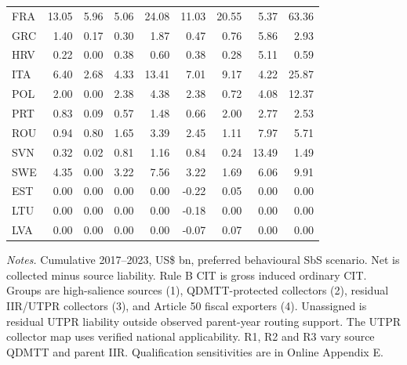 \begin{table}[htbp]
\begin{tabular}{@{}lrrrrrrrr@{}}
FRA & 13.05 &  5.96 &  5.06 & 24.08 & 11.03 & 20.55 &   5.37 &  63.36 \\
GRC &  1.40 &  0.17 &  0.30 &  1.87 &  0.47 &  0.76 &   5.86 &   2.93 \\
HRV &  0.22 &  0.00 &  0.38 &  0.60 &  0.38 &  0.28 &   5.11 &   0.59 \\
ITA &  6.40 &  2.68 &  4.33 & 13.41 &  7.01 &  9.17 &   4.22 &  25.87 \\
POL &  2.00 &  0.00 &  2.38 &  4.38 &  2.38 &  0.72 &   4.08 &  12.37 \\
PRT &  0.83 &  0.09 &  0.57 &  1.48 &  0.66 &  2.00 &   2.77 &   2.53 \\
ROU &  0.94 &  0.80 &  1.65 &  3.39 &  2.45 &  1.11 &   7.97 &   5.71 \\
SVN &  0.32 &  0.02 &  0.81 &  1.16 &  0.84 &  0.24 &  13.49 &   1.49 \\
SWE &  4.35 &  0.00 &  3.22 &  7.56 &  3.22 &  1.69 &   6.06 &   9.91 \\
EST &  0.00 &  0.00 &  0.00 &  0.00 & -0.22 &  0.05 &   0.00 &   0.00 \\
LTU &  0.00 &  0.00 &  0.00 &  0.00 & -0.18 &  0.00 &   0.00 &   0.00 \\
LVA &  0.00 &  0.00 &  0.00 &  0.00 & -0.07 &  0.07 &   0.00 &   0.00 \\
\bottomrule
\end{tabular}
\par\vspace{0.6em}
\begin{minipage}{\textwidth}\footnotesize\raggedright\textit{Notes.} Cumulative 2017–2023, US\$ bn, preferred behavioural SbS scenario. Net is collected minus source liability. Rule B CIT is gross induced ordinary CIT. Groups are high-salience sources (1), QDMTT-protected collectors (2), residual IIR/UTPR collectors (3), and Article 50 fiscal exporters (4). Unassigned is residual UTPR liability outside observed parent-year routing support. The UTPR collector map uses verified national applicability. R1, R2 and R3 vary source QDMTT and parent IIR. Qualification sensitivities are in Online Appendix E.\end{minipage}
\end{table}
